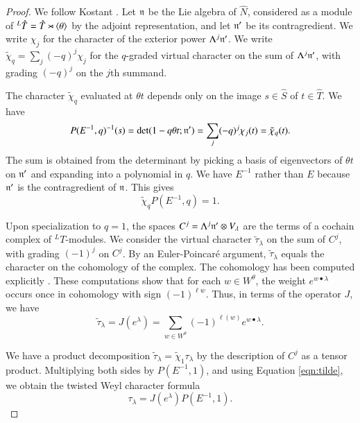 \begin{proof} We follow Kostant \cite{kostant1961lie}.
Let ${\mathfrak n}$ be the Lie algebra of $\hat N$, considered as a module of ${}^L\hat T=\hat T\rtimes\langle{\theta}\rangle$ by the adjoint representation,
and let ${\mathfrak n}'$ be its contragredient.  We write $\chi_j$ for the character of the exterior power $\Lambda^j {\mathfrak n}'$.
  We write $\tilde\chi_q = \sum_j (-q)^j\chi_j$
for the $q$-graded virtual character on the sum of $\Lambda^j {\mathfrak n}'$, with grading $(-q)^j$ on the $j$th summand.  

The character $\tilde\chi_q$ evaluated at $\theta t$ depends only on the image $s\in\hat S$ of $t\in \hat T$.
We have 
\[
P(E^{-1},q)^{-1}(s) = \det(1- q\theta t;{\mathfrak n}') = \sum_j (-q)^j \chi_j(t) = \tilde\chi_q(t).
\]
The sum is obtained from
 the determinant  by picking a basis of eigenvectors of $\theta t$ on ${\mathfrak n}'$ and expanding into a polynomial
in $q$.
We have $E^{-1}$ rather than $E$ because ${\mathfrak n}'$ is the contragredient of ${\mathfrak n}$.
This gives
\begin{equation}\label{eqn:tilde}
\tilde\chi_q P(E^{-1},q) = 1.
\end{equation}

Upon specialization to $q=1$, 
the spaces $C^j=\Lambda^j {\mathfrak n}'\otimes V_\lambda$ are the terms of a cochain complex of ${}^LT$-modules.
We consider the virtual character $\tilde \tau_\lambda$ on  
the sum of $C^j$, with grading $(-1)^j$ on $C^j$.  
By an Euler-Poincar\'e argument, 
$\tilde\tau_\lambda$ equals the character on the cohomology of the complex.  The cohomology has 
been computed explicitly \cite{kostant1961lie}.
These computations show that for each $w\in W^\theta$, the weight $e^{w\bullet \lambda}$ 
occurs once in cohomology with sign $(-1)^{\ell w}$.
Thus, in terms of the operator $J$, we have
\[
\tilde \tau_\lambda = J(e^\lambda) = \sum_{w\in W^\theta} (-1)^{\ell(w)} e^{w\bullet\lambda}.
\]

We have  a product decomposition $\tilde \tau_\lambda = \tilde \chi_{1}\tau_\lambda $ by the description of $C^j$ as
a tensor product.
Multiplying both sides by $P(E^{-1},1)$, and using
Equation \ref{eqn:tilde}, we obtain the twisted Weyl character formula
\begin{equation}
\tau_\lambda = J(e^\lambda) P(E^{-1},1).
\end{equation}
\end{proof}

